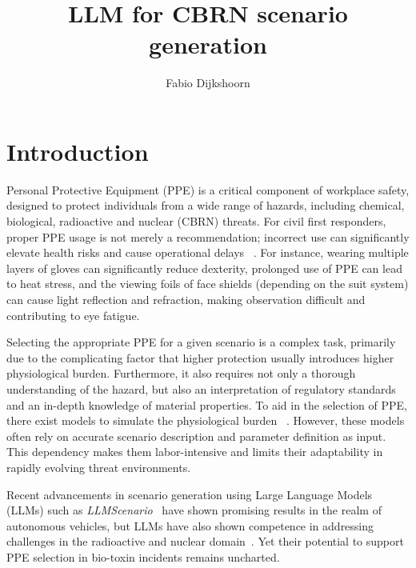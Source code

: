 \documentclass[stu]{apa7}
\begin{document}
    \title{LLM for CBRN scenario generation}
    \author{Fabio Dijkshoorn}
    \maketitle

    \section{Introduction}\label{sec:introduction}
    Personal Protective Equipment (PPE) is a critical component of workplace safety,
    designed to protect individuals from a wide range of hazards, including chemical,
    biological, radioactive and nuclear (CBRN) threats.
    For civil first responders, proper PPE usage is not merely a recommendation; incorrect
    use can significantly elevate health risks and cause operational delays ~\cite{world2020personal}.
    For instance, wearing multiple layers of gloves can significantly reduce dexterity,
    prolonged use of PPE can lead to heat stress, and the viewing foils of
    face shields (depending on the suit system) can cause light reflection and
    refraction, making observation difficult and contributing to eye fatigue.

    Selecting the appropriate PPE for a given scenario is a complex task, primarily due
    to the complicating factor that higher protection usually introduces higher
    physiological burden.
    Furthermore, it also requires not only a thorough understanding of the hazard, but
    also an interpretation of regulatory standards and an in-depth knowledge of
    material properties.
    To aid in the selection of PPE, there exist models to simulate the physiological
    burden ~\cite{brasser2023scenario}.
    However, these models often rely on accurate scenario description and parameter
    definition as input.
    This dependency makes them labor-intensive and limits their adaptability in
    rapidly evolving threat environments.

    Recent advancements in scenario generation using Large Language Models (LLMs) such as
    \textit{LLMScenario}~\cite{chang_llmscenario_2024} have shown promising results in the
    realm of autonomous vehicles, but LLMs have also shown competence in addressing challenges
    in the radioactive and nuclear domain~\cite{iob_nuclear_2024}.
    Yet their potential to support PPE selection in bio-toxin incidents remains uncharted.
\end{document}
